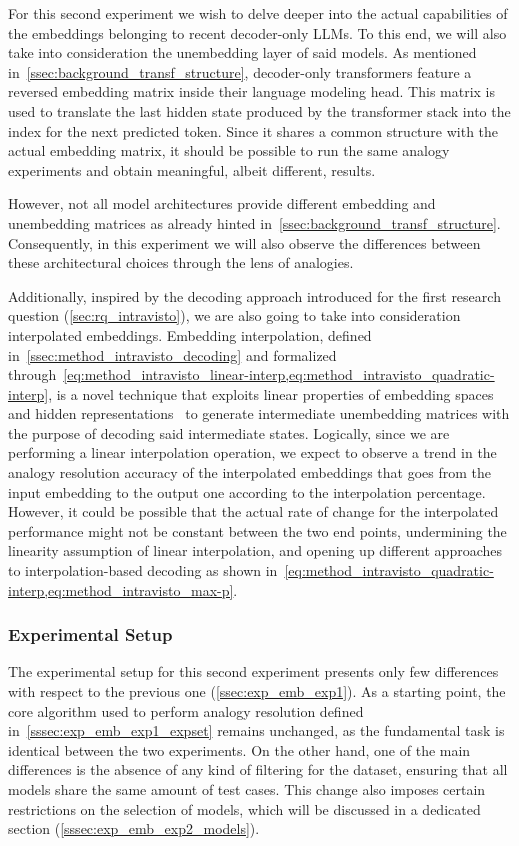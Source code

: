 For this second experiment we wish to delve deeper into the actual capabilities of the embeddings belonging to recent decoder-only LLMs.
To this end, we will also take into consideration the unembedding layer of said models.
As mentioned in~\cref{ssec:background_transf_structure}, decoder-only transformers feature a reversed embedding matrix inside their language modeling head.
This matrix is used to translate the last hidden state produced by the transformer stack into the index for the next predicted token.
Since it shares a common structure with the actual embedding matrix, it should be possible to run the same analogy experiments and obtain meaningful, albeit different, results.

However, not all model architectures provide different embedding and unembedding matrices as already hinted in~\cref{ssec:background_transf_structure}.
Consequently, in this experiment we will also observe the differences between these architectural choices through the lens of analogies.

Additionally, inspired by the decoding approach introduced for the first research question (\cref{sec:rq_intravisto}), we are also going to take into consideration interpolated embeddings.
Embedding interpolation, defined in~\cref{ssec:method_intravisto_decoding} and formalized through~\cref{eq:method_intravisto_linear-interp,eq:method_intravisto_quadratic-interp}, is a novel technique that exploits linear properties of embedding spaces and hidden representations~\cite{park2023, mikolov2013, drozd2016} to generate intermediate unembedding matrices with the purpose of decoding said intermediate states.
Logically, since we are performing a linear interpolation operation, we expect to observe a trend in the analogy resolution accuracy of the interpolated embeddings that goes from the input embedding to the output one according to the interpolation percentage.
However, it could be possible that the actual rate of change for the interpolated performance might not be constant between the two end points, undermining the linearity assumption of linear interpolation, and opening up different approaches to interpolation-based decoding as shown in~\cref{eq:method_intravisto_quadratic-interp,eq:method_intravisto_max-p}.

\subsubsection{Experimental Setup}

The experimental setup for this second experiment presents only few differences with respect to the previous one (\cref{ssec:exp_emb_exp1}).
As a starting point, the core algorithm used to perform analogy resolution defined in~\cref{sssec:exp_emb_exp1_expset} remains unchanged, as the fundamental task is identical between the two experiments.
On the other hand, one of the main differences is the absence of any kind of filtering for the dataset, ensuring that all models share the same amount of test cases.
This change also imposes certain restrictions on the selection of models, which will be discussed in a dedicated section (\cref{sssec:exp_emb_exp2_models}).

